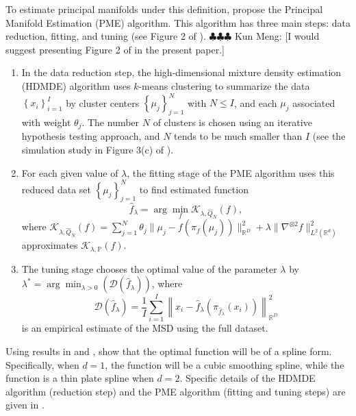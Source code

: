 \documentclass[11pt,reqno]{article}
\newcommand{\meng}[1]{{\color{purple} \sf $\clubsuit\clubsuit\clubsuit$ Kun Meng: [#1]}}
\theoremstyle{definition}
\begin{document}
To estimate principal manifolds under this definition, \cite{mengPrincipalManifoldEstimation2021} propose the Principal Manifold Estimation (PME) algorithm. This algorithm has three main steps: data reduction, fitting, and tuning (see Figure 2 of \cite{mengPrincipalManifoldEstimation2021}). \meng{I would suggest presenting Figure 2 of \cite{mengPrincipalManifoldEstimation2021} in the present paper.}
\begin{enumerate}
    \item In the data reduction step, the high-dimensional mixture density estimation (HDMDE) algorithm uses $k$-means clustering to summarize the data $\left\{x_i\right\}_{i=1}^{I}$ by cluster centers $\left\{\mu_j\right\}_{j=1}^{N}$ with $N \leq I$, and each $\mu_j$ associated with weight $\theta_j$. The number $N$ of clusters is chosen using an iterative hypothesis testing approach, and $N$ tends to be much smaller than $I$ (see the simulation study in Figure 3(c) of \cite{mengPrincipalManifoldEstimation2021}). 
    \item For each given value of $\lambda$, the fitting stage of the PME algorithm uses this reduced data set $\left\{\mu_j\right\}_{j=1}^{N}$ to find estimated function 
\begin{equation}
  \hat{f}_\lambda = \arg\min_f \mathcal{K}_{\lambda, \hat{Q}_N}(f), \label{eq:8}
\end{equation}
where $\mathcal{K}_{\lambda, \hat{Q}_N}(f) = \sum_{j = 1}^{N}\theta_j \|\mu_j - f(\pi_f(\mu_j))\|_{\mathbb{R}^{D}}^2 + \lambda\|\nabla^{\otimes 2}f\|_{L^2(\mathbb{R}^{d})}^2$ approximates $\mathcal{K}_{\lambda, \mathbb{P}}(f)$. 
\item The tuning stage chooses the optimal value of the parameter $\lambda$ by $\lambda^{*} = \arg\min_{\lambda > 0}(\mathcal{D}(\hat{f}_\lambda))$, where 
\begin{equation}
  \mathcal{D}\left(\hat{f}_\lambda\right) = \frac{1}{I}\sum_{i=1}^{I}\left\|x_i - \hat{f}_\lambda\left(\pi_{\hat{f}_\lambda}(x_i)\right)\right\|_{\mathbb{R}^{D}}^2 \label{eq:10}
\end{equation}
is an empirical estimate of the MSD using the full dataset.
\end{enumerate}

Using results in \cite{duchon1977splines} and \cite{wahba1990}, \cite{mengPrincipalManifoldEstimation2021} show that the optimal function will be of a spline form. Specifically, when $d = 1$, the function will be a cubic smoothing spline, while the function is a thin plate spline when $d = 2$. Specific details of the HDMDE algorithm (reduction step) and the PME algorithm (fitting and tuning steps) are given in \cite{mengPrincipalManifoldEstimation2021}.
\end{document}
